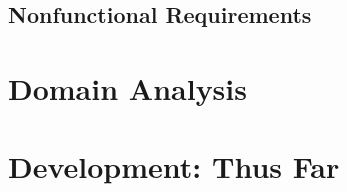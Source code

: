 \documentclass[12pt]{article}
\begin{document}
\subsection{Nonfunctional Requirements}


\section{Domain Analysis}


\section{Development: Thus Far}
\end{document}
